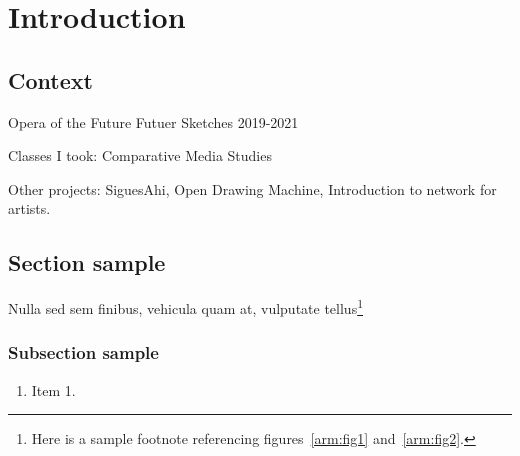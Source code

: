 \chapter{Introduction}

\section{Context}

Opera of the Future
Futuer Sketches
2019-2021

Classes I took: Comparative Media Studies

Other projects: SiguesAhi, Open Drawing Machine, Introduction to network for artists.

\section{Section sample}\label{ch1:sec}

Nulla sed sem finibus, vehicula quam at, vulputate tellus\footnote{Here is a sample footnote referencing figures~\ref{arm:fig1}
and~\ref{arm:fig2}.}  

\subsection{Subsection sample}

\begin{enumerate}
  \item Item 1.
\end{enumerate}
